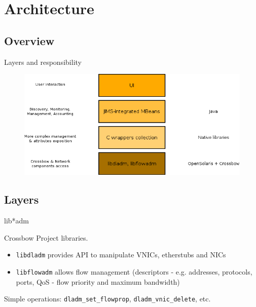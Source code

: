 \documentclass{beamer}
\begin{document}
\section{Architecture}

	\subsection{Overview}

		\begin{frame}{Layers and responsibility}

			\begin{figure}[H]
				\includegraphics[width=\textwidth]{img/layers.png}
			\end{figure}
			
		\end{frame}
	

	\subsection{Layers}

		\begin{frame}{lib*adm}

			Crossbow Project libraries.

			\begin{itemize}
				\item \texttt{libdladm} provides API to manipulate VNICs, etherstubs and NICs
				\item \texttt{libflowadm} allows flow management (descriptors - e.g. addresses, protocols, ports, QoS - flow priority and maximum bandwidth)
			\end{itemize}

			Simple operations: \texttt{dladm\_set\_flowprop}, \texttt{dladm\_vnic\_delete}, etc.

		\end{frame}
	
\end{document}
